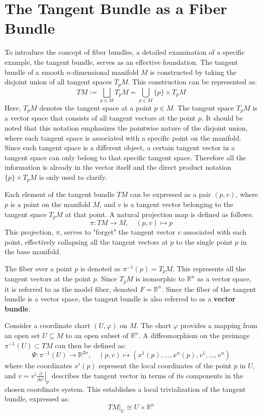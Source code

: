 \section{The Tangent Bundle as a Fiber Bundle}

To introduce the concept of fiber bundles, a detailed examination of a specific example, the tangent bundle, serves as an effective foundation.
The tangent bundle of a smooth \( n \)-dimensional manifold \( M \) is constructed by taking the disjoint union of all tangent spaces \( T_pM \). This construction can be represented as:
\[
TM := \bigsqcup_{p \in M} T_pM = \bigcup_{p \in M} \{p\} \times T_pM
\]
Here, \( T_pM \) denotes the tangent space at a point \( p \in M \). The tangent space \( T_pM \) is a vector space that consists of all tangent vectors at the point \( p \). It should be noted that this notation emphasizes the pointwise nature of the disjoint union, where each tangent space is associated with a specific point on the manifold. Since each tangent space is a different object, a certain tangent vector in a tangent space can only belong to that specific tangent space. Therefore all the information is already in the vector itself and the direct product notation \( \{p\} \times T_pM \) is only used to clarify\cite{FredericSchullerTopologicalmanifoldsmanifoldbundlesLec06FredericSchuller2015}.

Each element of the tangent bundle \( TM \) can be expressed as a pair \( (p, v) \), where \( p \) is a point on the manifold \( M \), and \( v \) is a tangent vector belonging to the tangent space \( T_pM \) at that point. 
A natural projection map is defined as follows:
\[
\pi: TM \to M, \quad (p, v) \mapsto p
\]
This projection, \( \pi \), serves to "forget" the tangent vector \( v \) associated with each point, effectively collapsing all the tangent vectors at \( p \) to the single point \( p \) in the base manifold\cite{NakaharaGeometrytopologyphysics2005}.

The fiber over a point \( p \) is denoted as \( \pi^{-1}(p) = T_pM \). This represents all the tangent vectors at the point \( p \). Since \( T_pM \) is isomorphic to \( \mathbb{R}^n \) as a vector space, it is referred to as the model fiber, denoted \( F = \mathbb{R}^n \)\cite{NakaharaGeometrytopologyphysics2005}.
Since the fiber of the tangent bundle is a vector space, the tangent bundle is also referred to as a \textbf{vector bundle}.

Consider a coordinate chart \( (U, \varphi) \) on \( M \). The chart \( \varphi \) provides a mapping from an open set \( U \subseteq M \) to an open subset of \( \mathbb{R}^n \). A diffeomorphism on the preimage \( \pi^{-1}(U) \subset TM \) can then be defined as:
\[
\Psi: \pi^{-1}(U) \to \mathbb{R}^{2n}, \quad (p, v) \mapsto \left(x^1(p), \dots, x^n(p), v^1, \dots, v^n \right)
\]
where the coordinates \( x^i(p) \) represent the local coordinates of the point \( p \) in \( U \), and \( v = v^i \left. \frac{\partial}{\partial x^i} \right|_p \) describes the tangent vector in terms of its components in the chosen coordinate system\cite{NakaharaGeometrytopologyphysics2005}.
This establishes a local trivialization of the tangent bundle, expressed as:
\[
TM|_U \cong U \times \mathbb{R}^n
\]

